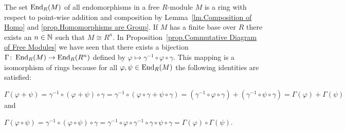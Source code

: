 \begin{rem}
The set $\operatorname{\mathrm{End}}_R(M)$ of all endomorphisms in a free $R$-module $M$ is a ring with respect to point-wise addition and composition  by Lemma~\ref{lm.Composition of Homo} and \cref{prop.Homomorphisms are Group}. If $M$ has a finite base over $R$ there exists an $n\in\operatorname{\mathbb{N}}$ such that $M\cong R^n$. In Proposition~\ref{prop.Commutative Diagram of Free Modules} we have seen that there exists a bijection $\Gamma\colon\operatorname{\mathrm{End}}_R(M)\to\operatorname{\mathrm{End}}_R(R^n)$ defined by $\varphi\mapsto\gamma^{-1}\circ\varphi\circ\gamma$. This mapping is a isomorphism of rings because for all $\varphi,\psi\in\operatorname{\mathrm{End}}_R(M)$ the following identities are satisfied:
\begin{exlist}
\item $\Gamma(\varphi+\psi)=\gamma^{-1}\circ(\varphi+\psi)\circ\gamma =\gamma^{-1}\circ(\varphi\circ\gamma+\psi\circ\gamma)= (\gamma^{-1}\circ\varphi\circ\gamma)+(\gamma^{-1}\circ\psi\circ\gamma)=\Gamma(\varphi)+\Gamma(\psi)$ and
\item $\Gamma(\varphi\circ\psi)=\gamma^{-1}\circ(\varphi\circ\psi)\circ\gamma =\gamma^{-1}\circ\varphi\circ\gamma^{-1}\circ\gamma\circ\psi\circ\gamma =\Gamma(\varphi)\circ\Gamma(\psi)$.
\end{exlist}
\end{rem}

